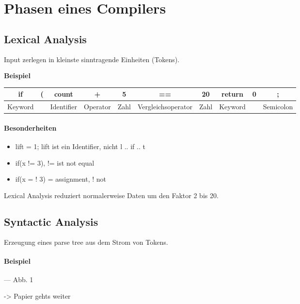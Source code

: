 \section{Phasen eines Compilers}

\subsection{Lexical Analysis}
Input zerlegen in kleinste sinntragende Einheiten (Tokens). 

\textbf{Beispiel}\\
\begin{tabular}{|c|c|c|c|c|c|c|c|c|c|}
\hline if & ( & count & + & 5 & == & 20& return & 0 & ; \\ 
\hline Keyword &  & Identifier & Operator & Zahl & Vergleichsoperator & Zahl & Keyword & & Semicolon\\ 
\hline 
\end{tabular} 

\paragraph{Besonderheiten}

\begin{itemize}
\item lift = 1; lift ist ein Identifier, nicht l .. if .. t
\item if(x != 3), != ist not equal
\item if(x = ! 3) = assignment, ! not
\end{itemize}

Lexical Analysis reduziert normalerweise Daten um den Faktor 2 bis 20. 

\subsection{Syntactic Analysis}
Erzeugung eines parse tree aus dem Strom von Tokens. 

\paragraph{Beispiel}
--- Abb. 1

-> Papier gehts weiter